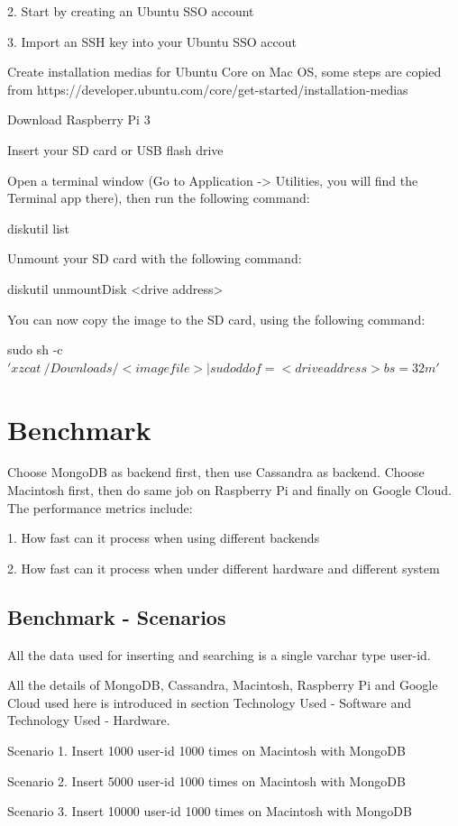 2. Start by creating an Ubuntu SSO account 

3. Import an SSH key into your Ubuntu SSO accout 

Create installation medias for Ubuntu Core on Mac OS, some steps are copied from
https://developer.ubuntu.com/core/get-started/installation-medias

Download Raspberry Pi 3

Insert your SD card or USB flash drive

Open a terminal window (Go to Application -> Utilities, you will find the Terminal 
app there), then run the following command:

 diskutil list
 
 
Unmount your SD card with the following command:

diskutil unmountDisk <drive address>

You can now copy the image to the SD card, using the following command:

sudo sh -c $'xzcat ~/Downloads/<image file> | sudo dd of=<drive address> bs=32m'$

\section{Benchmark}
Choose MongoDB as backend first, then use Cassandra as backend. 
Choose Macintosh first, then do same job on Raspberry Pi and finally on Google Cloud.
The performance metrics include: 

1. How fast can it process when using different backends

2. How fast can it process when under different hardware and different system

\subsection{Benchmark - Scenarios}

All the data used for inserting and searching is a single varchar type user-id.

All the details of MongoDB,  Cassandra, Macintosh, Raspberry Pi  and 
Google Cloud used here is introduced in section Technology Used - 
Software and Technology Used - Hardware.

Scenario 1. Insert 1000 user-id 1000 times on Macintosh with MongoDB 

Scenario 2. Insert 5000 user-id 1000 times on Macintosh with MongoDB 

Scenario 3. Insert 10000 user-id 1000 times on Macintosh with MongoDB 

